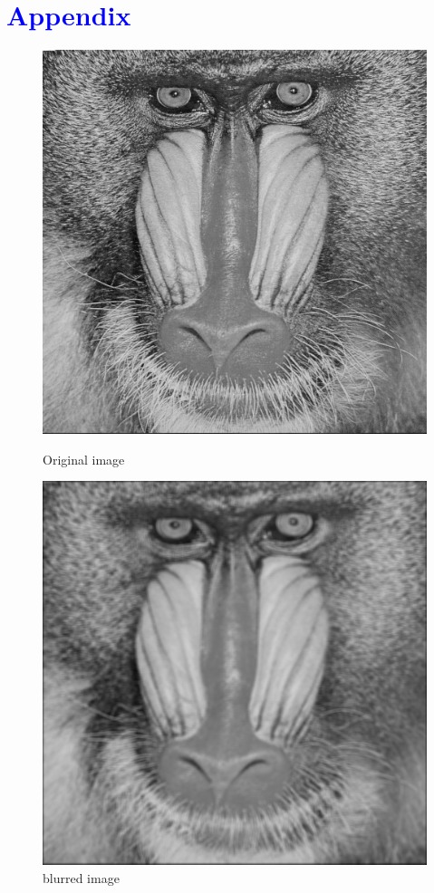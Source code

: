 \documentclass{article}
\begin{document}
\section*{\centering\textcolor{blue}{Appendix}}
\begin{figure}[H]
	\centering
	\begin{minipage}[b]{0.46\linewidth}
		\includegraphics[width=\linewidth,bb=0 0 20cm 20cm]{baboon.bmp}
		\caption{Original image}
	\end{minipage}
	\begin{minipage}[b]{0.46\linewidth}
		\includegraphics[width=\linewidth,bb=0 0 20cm 20cm]{blurred.bmp}
		\caption{blurred image}
		\label{blur}
	\end{minipage}
\end{figure}
\end{document}
